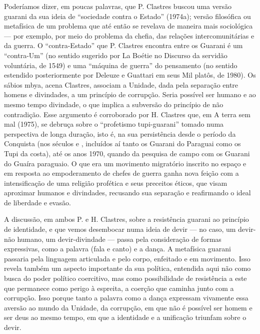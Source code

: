 Poderíamos dizer, em poucas palavras, que P. Clastres buscou uma versão
guarani da sua ideia de ``sociedade contra o Estado'' (1974a); versão
filosófica ou metafísica de um problema que até então se revelava de
maneira mais sociológica — por exemplo, por meio do problema da chefia,
das relações intercomunitárias e da guerra. O ``contra-Estado'' que P.
Clastres encontra entre os Guarani é um ``contra-Um'' (no sentido
sugerido por La Boétie no Discurso da servidão voluntária, de 1549) e
uma ``máquina de guerra'' do pensamento (no sentido estendido
posteriormente por Deleuze e Guattari em seus Mil platôs, de 1980). Os
sábios mbya, acena Clastres, associam a Unidade, dada pela separação
entre homens e divindades, a um princípio de corrupção. Seria possível
ser humano e ao mesmo tempo divindade, o que implica a subversão do
princípio de não contradição. Esse argumento é corroborado por H.
Clastres que, em A terra sem mal (1975), se debruça sobre o ``profetismo
tupi-guarani'' tomado numa perspectiva de longa duração, isto é, na sua
persistência desde o período da Conquista (nos séculos  e ,
incluídos aí tanto os Guarani do Paraguai como os Tupi da costa), até
os anos 1970, quando da pesquisa de campo com os Guarani do Guaíra
paraguaio. O que era um movimento migratório inscrito no espaço e em
resposta ao empoderamento de chefes de guerra ganha nova feição com a
intensificação de uma religião profética e seus preceitos éticos, que
visam aproximar humanos e divindades, recusando sua separação e
reafirmando o ideal de liberdade e evasão.

A discussão, em ambos P. e H. Clastres, sobre a resistência guarani ao
princípio de identidade, e que vemos desembocar numa ideia de devir —
no caso, um devir-não humano, um devir-divindade — passa pela
consideração de formas expressivas, como a palavra (fala e canto) e a
dança. A metafísica guarani passaria pela linguagem articulada e pelo
corpo, enfeitado e em movimento. Isso revela também um aspecto
importante da sua política, entendida aqui não como busca do poder
político coercitivo, mas como possibilidade de resistência a este que
permanece como perigo à espreita, a coerção que caminha junto com a
corrupção. Isso porque tanto a palavra como a dança expressam vivamente
essa aversão ao mundo da Unidade, da corrupção, em que não é possível
ser homem e ser deus ao mesmo tempo, em que a identidade e a unificação
triunfam sobre o devir. 

